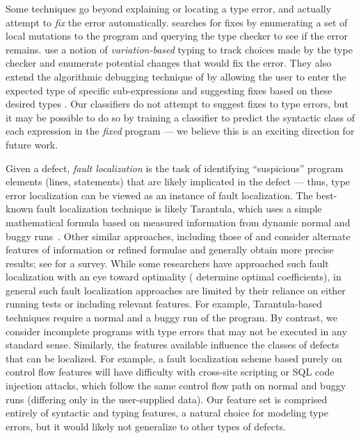 Some techniques go beyond explaining or locating a type error,
and actually attempt to \emph{fix} the error automatically.
%
\citet{Lerner2007-dt} searches for fixes by enumerating a
set of local mutations to the program and querying the type checker to
see if the error remains.
%
\citet{Chen2014-gd} use a notion of \emph{variation-based} typing to
track choices made by the type checker and enumerate potential
changes that would fix the error.
%
They also extend the algorithmic debugging technique of
\citeauthor{Chitil2001-td} by allowing the user to enter the expected
type of specific sub-expressions and suggesting fixes based on these
desired types \citeyear{Chen2014-vm}.
%
Our classifiers do not attempt to suggest fixes to type errors, but it
may be possible to do so by training a classifier to predict the
syntactic class of each expression in the \emph{fixed} program --- we
believe this is an exciting direction for future work.

%
Given a defect, \emph{fault localization} is the task of identifying
``suspicious'' program elements (\eg lines, statements) that are likely
implicated in the defect %
%
--- thus, type error localization can be viewed as an instance of fault
localization.
%
The best-known fault localization technique is likely Tarantula, which
uses a simple mathematical formula based on measured information from
dynamic normal and buggy runs~\citep{Jones2002-us}.
%
Other similar approaches, including those of \citet{Chen2002-qz} and
\citet{Abreu2006-fn,Abreu2007-mu} consider alternate features of
information or refined formulae and generally obtain more precise
results; see \citet{Wong2009-pd} for a survey.
%
While some researchers have approached such fault localization with an
eye toward optimality (\eg \citet{Yoo2013-rw} determine optimal
coefficients), in general such fault localization approaches are limited
by their reliance on either running tests or including relevant
features.
%
For example, Tarantula-based techniques require a normal and a buggy run
of the program.
%
By contrast, we consider incomplete programs with type errors that may
not be executed in any standard sense.
%
Similarly, the features available influence the classes of defects that
can be localized.
%
For example, a fault localization scheme based purely on control flow features
will have difficulty with cross-site scripting or SQL code injection
attacks, which follow the same control flow path on normal and buggy
runs (differing only in the user-supplied data).
%
Our feature set is comprised entirely of syntactic and typing features,
a natural choice for modeling type errors, but it would likely not
generalize to other types of defects.





